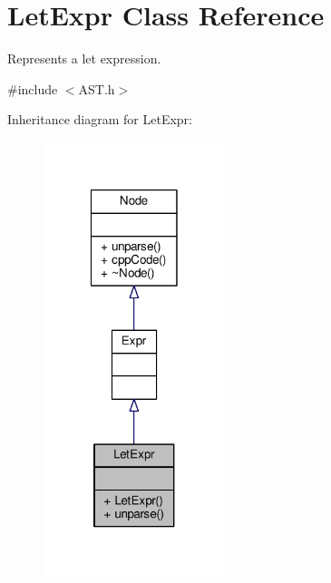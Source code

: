 \hypertarget{classLetExpr}{\section{Let\-Expr Class Reference}
\label{classLetExpr}
}


Represents a let expression. \par
  




{\ttfamily \#include $<$A\-S\-T.\-h$>$}



Inheritance diagram for Let\-Expr\-:\nopagebreak
\begin{figure}[H]
\begin{center}
\leavevmode
\includegraphics[width=150pt]{classLetExpr__inherit__graph}
\end{center}
\end{figure}


